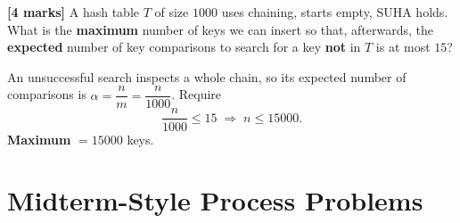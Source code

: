\documentclass[11pt]{article}
\begin{document}
\begin{exambox}
\textbf{[4 marks]} A hash table $T$ of size $1000$ uses chaining, starts empty, SUHA holds. What is the \textbf{maximum} number of keys we can insert so that, afterwards, the \textbf{expected} number of key comparisons to search for a key \textbf{not} in $T$ is at most $15$?

\begin{answerband}
An unsuccessful search inspects a whole chain, so its expected number of comparisons is $\alpha = \dfrac{n}{m} = \dfrac{n}{1000}$. Require
\[
  \frac{n}{1000} \le 15 \;\Longrightarrow\; n \le 15000.
\]
\textcolor{violetT}{\textbf{Maximum} $= 15000$ keys.}
\end{answerband}
\end{exambox}

\section{Midterm-Style Process Problems}
\end{document}
